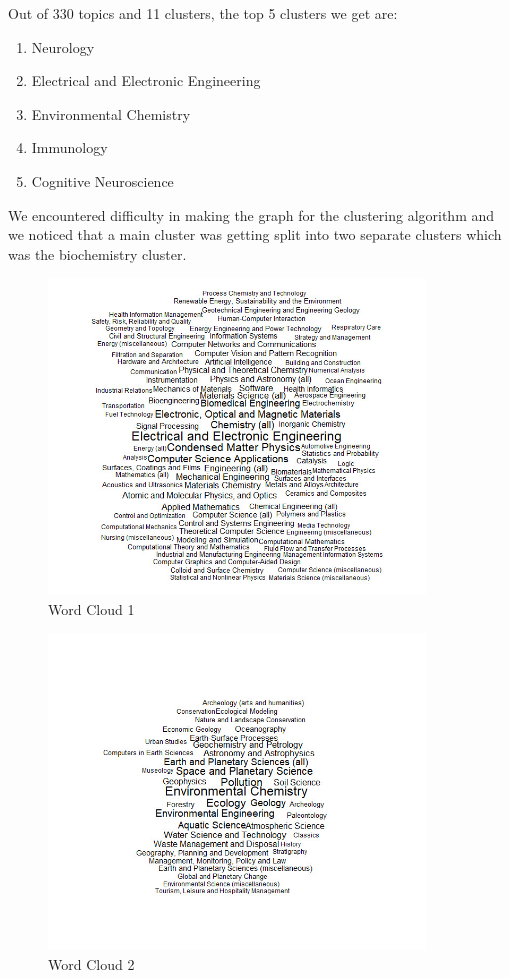 \documentclass[a4paper,11pt]{article}
\theoremstyle{mytheor}
\begin{document}
Out of 330 topics and 11 clusters, the top 5 clusters we get are:

\begin{enumerate}[1.]
\item Neurology
\item Electrical and Electronic Engineering
\item Environmental Chemistry
\item Immunology
\item Cognitive Neuroscience
\end{enumerate}
We encountered difficulty in making the graph for the clustering algorithm and we noticed that a main cluster was getting split into two separate clusters which was the biochemistry cluster.
\begin{figure}[!htb]
    \centering
    \includegraphics[width=10cm]{1.jpeg}
    \caption{Word Cloud 1}
    \label{fig:galaxy}
\end{figure}

\begin{figure}[!htb]
    \centering
    \includegraphics[width=10cm]{2.jpeg}
    \caption{Word Cloud 2}
    \label{fig:galaxy}
\end{figure}
\end{document}
